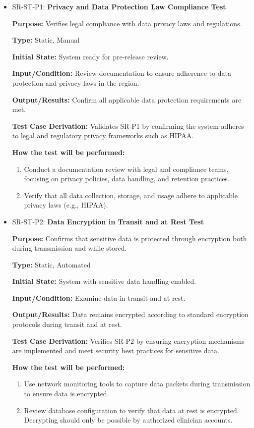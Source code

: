 \documentclass[12pt, titlepage]{article}
\begin{document}
\begin{itemize}
  \item SR-ST-P1: \textbf{Privacy and Data Protection Law Compliance Test}
  \begin{mdframed}[linewidth=0.5mm]
      \textbf{Purpose:} Verifies legal compliance with data privacy laws and regulations. \par
      \textbf{Type:} Static, Manual \par
      \textbf{Initial State:} System ready for pre-release review. \par
      \textbf{Input/Condition:} Review documentation to ensure adherence to data protection and privacy laws in the region. \par
      \textbf{Output/Results:} Confirm all applicable data protection requirements are met. \par
      \textbf{Test Case Derivation:} Validates SR-P1 by confirming the system adheres to legal and regulatory privacy frameworks such as HIPAA. \par
      \textbf{How the test will be performed:}
      \begin{enumerate}[noitemsep]
        \item Conduct a documentation review with legal and compliance teams, focusing on privacy policies, data handling, and retention practices.
        \item Verify that all data collection, storage, and usage adhere to applicable privacy laws (e.g., HIPAA).
      \end{enumerate}
  \end{mdframed}

  \item SR-ST-P2: \textbf{Data Encryption in Transit and at Rest Test}
  \begin{mdframed}[linewidth=0.5mm]
      \textbf{Purpose:} Confirms that sensitive data is protected through encryption both during transmission and while stored. \par
      \textbf{Type:} Static, Automated \par
      \textbf{Initial State:} System with sensitive data handling enabled. \par
      \textbf{Input/Condition:} Examine data in transit and at rest. \par
      \textbf{Output/Results:} Data remains encrypted according to standard encryption protocols during transit and at rest. \par
      \textbf{Test Case Derivation:} Verifies SR-P2 by ensuring encryption mechanisms are implemented and meet security best practices for sensitive data. \par
      \textbf{How the test will be performed:}
      \begin{enumerate}[noitemsep]
        \item Use network monitoring tools to capture data packets during transmission to ensure data is encrypted.
        \item Review database configuration to verify that data at rest is encrypted. \\ Decrypting should only be possible by authorized clinician accounts.
      \end{enumerate}
  \end{mdframed}


\end{itemize}
\end{document}
